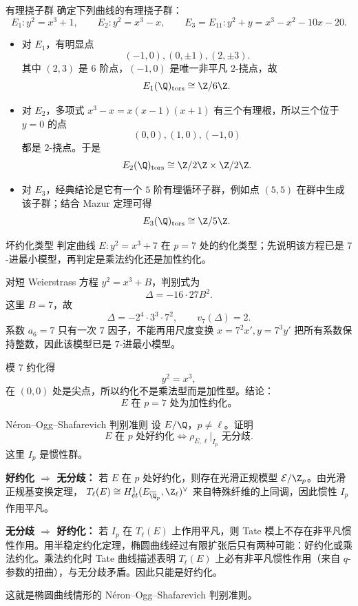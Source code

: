 \begin{problem}{有理挠子群 \medium}
确定下列曲线的有理挠子群：
\[
E_1:y^2=x^3+1,
\qquad
E_2:y^2=x^3-x,
\qquad
E_3=E_{11}:y^2+y=x^3-x^2-10x-20.
\]
\end{problem}
\begin{solution}
\begin{itemize}
  \item 对 $E_1$，有明显点
  \[
  (-1,0),(0,\pm1),(2,\pm3).
  \]
  其中 $(2,3)$ 是 $6$ 阶点，$(-1,0)$ 是唯一非平凡 $2$-挠点，故
  \[
  E_1(\Q)_{\mathrm{tors}}\cong \Z/6\Z.
  \]
  \item 对 $E_2$，多项式 $x^3-x=x(x-1)(x+1)$ 有三个有理根，所以三个位于 $y=0$ 的点
  \[
  (0,0),(1,0),(-1,0)
  \]
  都是 $2$-挠点。于是
  \[
  E_2(\Q)_{\mathrm{tors}}\cong \Z/2\Z\times \Z/2\Z.
  \]
  \item 对 $E_3$，经典结论是它有一个 $5$ 阶有理循环子群，例如点 $(5,5)$ 在群中生成该子群；结合 Mazur 定理可得
  \[
  E_3(\Q)_{\mathrm{tors}}\cong \Z/5\Z.
  \]
\end{itemize}
\end{solution}

\begin{problem}{坏约化类型 \medium}
判定曲线 $E:y^2=x^3+7$ 在 $p=7$ 处的约化类型；先说明该方程已是 $7$-进最小模型，再判定是乘法约化还是加性约化。
\end{problem}
\begin{solution}
对短 Weierstrass 方程 $y^2=x^3+B$，判别式为
\[
\Delta=-16\cdot 27 B^2.
\]
这里 $B=7$，故
\[
\Delta=-2^4\cdot 3^3\cdot 7^2,
\qquad v_7(\Delta)=2.
\]
系数 $a_6=7$ 只有一次 $7$ 因子，不能再用尺度变换 $x=7^2x',y=7^3y'$ 把所有系数保持整数，因此该模型已是 $7$-进最小模型。

模 $7$ 约化得
\[
y^2=x^3,
\]
在 $(0,0)$ 处是尖点，所以约化不是乘法型而是加性型。结论：
\[
E\text{ 在 }p=7\text{ 处为加性约化。}
\]
\end{solution}

\begin{problem}{Néron--Ogg--Shafarevich 判别准则 \medium}
设 $E/\Q$，$p\neq \ell$。证明
\[
E\text{ 在 }p\text{ 处好约化}
\Longleftrightarrow
\rho_{E,\ell}|_{I_p}\text{ 无分歧}.
\]
这里 $I_p$ 是惯性群。
\end{problem}
\begin{solution}
\textbf{好约化 $\Rightarrow$ 无分歧：} 若 $E$ 在 $p$ 处好约化，则存在光滑正规模型 $\mathcal E/\Z_p$。由光滑正规基变换定理，
$T_\ell(E)\cong H^1_{\acute et}(E_{\overline{\Q}_p},\Z_\ell)^\vee$ 来自特殊纤维的上同调，因此惯性 $I_p$ 作用平凡。

\textbf{无分歧 $\Rightarrow$ 好约化：} 若 $I_p$ 在 $T_\ell(E)$ 上作用平凡，则 Tate 模上不存在非平凡惯性作用。用半稳定约化定理，椭圆曲线经过有限扩张后只有两种可能：好约化或乘法约化。乘法约化时 Tate 曲线描述表明 $T_\ell(E)$ 上必有非平凡惯性作用（来自 $q$-参数的扭曲），与无分歧矛盾。因此只能是好约化。

这就是椭圆曲线情形的 Néron--Ogg--Shafarevich 判别准则。
\end{solution}

